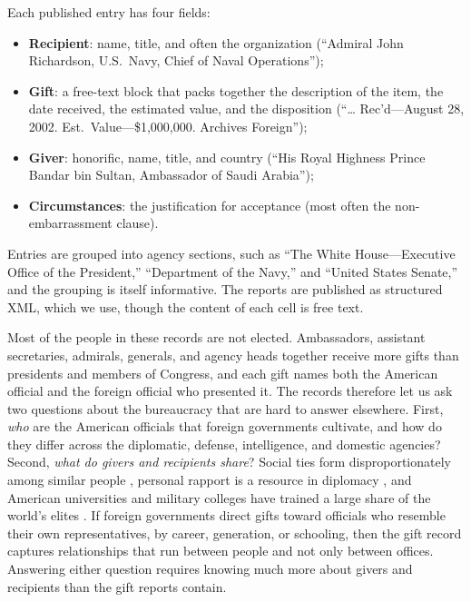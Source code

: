 \documentclass[11pt]{article}
\begin{document}
Each published entry has four fields:
\begin{itemize}
\item \textbf{Recipient}: name, title, and often the organization (``Admiral John Richardson, U.S.\ Navy, Chief of Naval Operations'');
\item \textbf{Gift}: a free-text block that packs together the description of the item, the date received, the estimated value, and the disposition (``\ldots{} Rec'd---August 28, 2002. Est.\ Value---\$1,000,000. Archives Foreign'');
\item \textbf{Giver}: honorific, name, title, and country (``His Royal Highness Prince Bandar bin Sultan, Ambassador of Saudi Arabia'');
\item \textbf{Circumstances}: the justification for acceptance (most often the non-embarrassment clause).
\end{itemize}
Entries are grouped into agency sections, such as ``The White House---Executive Office of the President,'' ``Department of the Navy,'' and ``United States Senate,'' and the grouping is itself informative. The reports are published as structured XML, which we use, though the content of each cell is free text.



Most of the people in these records are not elected. Ambassadors, assistant secretaries, admirals, generals, and agency heads together receive more gifts than presidents and members of Congress, and each gift names both the American official and the foreign official who presented it. The records therefore let us ask two questions about the bureaucracy that are hard to answer elsewhere. First, \emph{who} are the American officials that foreign governments cultivate, and how do they differ across the diplomatic, defense, intelligence, and domestic agencies? Second, \emph{what do givers and recipients share}? Social ties form disproportionately among similar people \citep{mcpherson2001birds}, personal rapport is a resource in diplomacy \citep{holmes2013force}, and American universities and military colleges have trained a large share of the world's elites \citep{atkinson2010soft,ruby2010pme,gift2017who}. If foreign governments direct gifts toward officials who resemble their own representatives, by career, generation, or schooling, then the gift record captures relationships that run between people and not only between offices. Answering either question requires knowing much more about givers and recipients than the gift reports contain.
\end{document}
